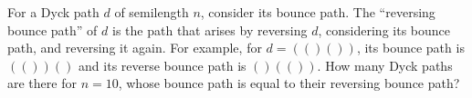 For a Dyck path $d$ of semilength $n$, consider its bounce path. The ``reversing bounce path'' of $d$ is the path that arises by reversing $d$, considering its bounce path, and reversing it again. For example, for $d=(()())$, its bounce path is $(())()$ and its reverse bounce path is $()(())$. How many Dyck paths are there for $n=10$, whose bounce path is equal to their reversing bounce path?
